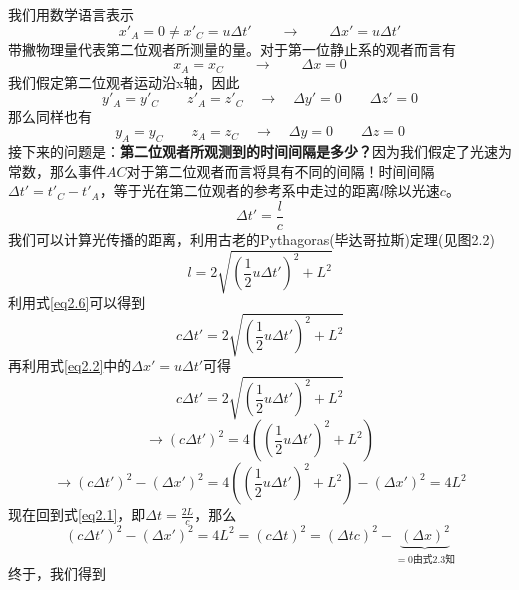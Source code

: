 我们用数学语言表示
\begin{equation}\label{eq2.2}
x'_A=0 \neq x'_C=u \Delta t' \qquad \rightarrow \qquad \Delta x' =u \Delta t'
\end{equation}
带撇物理量代表第二位观者所测量的量。对于第一位静止系的观者而言有
\begin{equation}
x_A=x_C \qquad \rightarrow \qquad \Delta x=0
\end{equation}
我们假定第二位观者运动沿x轴，因此
\begin{equation}
y'_A=y'_C \quad  \quad z'_A=z'_C \quad \rightarrow \quad \Delta y'=0 \quad  \quad \Delta z'=0
\end{equation}
那么同样也有
\begin{equation}
y_A=y_C \quad  \quad z_A=z_C \quad \rightarrow \quad \Delta y=0 \quad  \quad \Delta z=0
\end{equation}
接下来的问题是：{\bf{第二位观者所观测到的时间间隔是多少？}}因为我们假定了光速为常数，那么事件$AC$对于第二位观者而言将具有不同的间隔！时间间隔$\Delta t'=t'_C-t'_A$，等于光在第二位观者的参考系中走过的距离$l$除以光速$c$。
\begin{equation}\label{eq2.6}
\Delta t'=\frac{l}{c}
\end{equation}
{我们可以计算光传播的距离，利用古老的Pythagoras(毕达哥拉斯)定理(见图2.2)}
\begin{equation}
l=2 \sqrt{\left(\frac{1}{2} u \Delta t'\right)^2+L^2}
\end{equation}
利用式\ref{eq2.6}可以得到
\begin{equation}
c \Delta t' =2 \sqrt{\left(\frac{1}{2} u \Delta t'\right)^2+L^2}
\end{equation}
再利用式\ref{eq2.2}中的$\Delta x'=u\Delta t'$可得
\begin{displaymath}
c \Delta t' =
2 \sqrt{\left(\frac{1}{2} u \Delta t'\right)^2+L^2}
\end{displaymath}
\begin{displaymath}
\rightarrow
\left( c \Delta t' \right)^2 =
4 \left( \left(\frac{1}{2} u \Delta t'\right)^2+L^2 \right)
\end{displaymath}
\begin{equation}\label{eq2.9}
\rightarrow
\left( c \Delta t' \right)^2
-\left(\Delta x' \right)^2=
4 \left( \left(\frac{1}{2} u \Delta t'\right)^2+L^2 \right)
-\left(\Delta x' \right)^2 =4L^2
\end{equation}
现在回到式\ref{eq2.1}，即$\Delta t =\frac{2L}{c}$，那么
\begin{equation}\label{eq2.10}
\left( c \Delta t' \right)^2
-\left(\Delta x' \right)^2
=4 L^2
=\left( c \Delta t \right)^2
=\left( \Delta t c \right)^2
-\underbrace{\left(\Delta x \right)^2}_{=0 \texttt{由式}2.3 \texttt{知}}
\end{equation}
终于，我们得到



